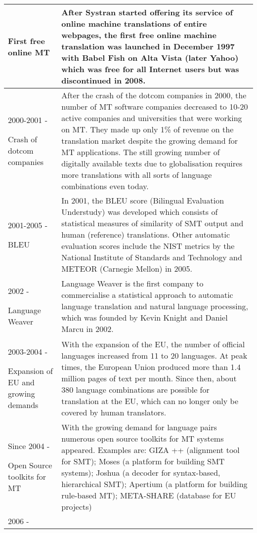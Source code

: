 \begin{longtable}[c]{ |>{\raggedright}p{2.8cm}||p{8.5cm}|  }
 First free online MT & After Systran started offering its service of online machine translations of entire webpages, the first free online machine translation was launched in December 1997 with Babel Fish on Alta Vista (later Yahoo) which was free for all Internet users but was discontinued in 2008.\\ \hline
 2000-2001 - 
 
 Crash of dotcom companies & After the crash of the dotcom companies in 2000, the number of MT software companies decreased to 10-20 active companies and universities that were working on MT. They made up only 1\% of revenue on the translation market despite the growing demand for MT applications. The still growing number of digitally available texts due to globalisation requires more translations with all sorts of language combinations even today.\\ \hline
 2001-2005 - 
 
 BLEU & In 2001, the BLEU score (Bilingual Evaluation Understudy) was developed which consists of statistical measures of similarity of SMT output and human (reference) translations. Other automatic evaluation scores include the NIST metrics by the National Institute of Standards and Technology and METEOR (Carnegie Mellon) in 2005.\\ \hline
 2002 - 
 
 Language Weaver & Language Weaver is the first company to commercialise a statistical approach to automatic language translation and natural language processing, which was founded by Kevin Knight and Daniel Marcu in 2002.\\ \hline
 2003-2004 - 
 
 Expansion of EU and growing demands & With the expansion of the EU, the number of official languages increased from 11 to 20 languages. At peak times, the European Union produced more than 1.4 million pages of text per month. Since then, about 380 language combinations are possible for translation at the EU, which can no longer only be covered by human translators.\\ \hline
 Since 2004 - 
 
 Open Source toolkits for MT & With the growing demand for language pairs numerous open source toolkits for MT systems appeared. Examples are: GIZA ++ (alignment tool for SMT); Moses (a platform for building SMT systems); Joshua (a decoder for syntax-based, hierarchical SMT); Apertium (a platform for building rule-based MT); META-SHARE (database for EU projects)\\ \hline
 2006 - 
 

\end{longtable}
